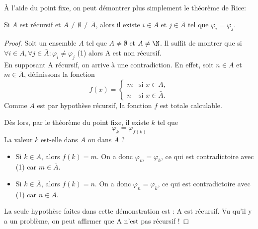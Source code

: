 \begin{myrem}
  À l'aide du point fixe, on peut démontrer plus simplement le théorème de Rice:

\begin{center}
Si $A$ est récursif et $A \neq \emptyset \neq \bar{A}$, alors il existe $i \in A$ et $j \in \bar{A}$ tel que $\varphi_i = \varphi_j$.
\end{center}

  \begin{proof}
    Soit un ensemble $A$ tel que $A \neq \emptyset$ et $A \neq \N$.  Il suffit de montrer que si
    $\forall i \in A, \forall j \in \bar{A} : \varphi_i \neq \varphi_j$  (1) alors A est non récursif. \\
    En supposant A récursif, on arrive à une contradiction.  En effet,
    soit $n \in A$ et $m \in \bar{A}$, définissons la fonction
    \[
      f(x) =
      \begin{cases}
        m & \text{si }x \in A,\\
        n & \text{si }x \in \bar{A}.
      \end{cases}
    \]
    Comme $A$ est par hypothèse récursif, la fonction $f$ est totale calculable.

    Dès lors, par le théorème du point fixe, il existe $k$ tel que
    \[ \varphi_k = \varphi_{f(k)} \]
    La valeur $k$ est-elle dans $A$ ou dans $\bar{A}$ ?
    \begin{itemize}
      \item Si $k \in A$, alors $f(k)=m$.  On a donc $\varphi_m = \varphi_k$, ce qui est contradictoire avec (1) car
       $m \in \bar{A}$.
      \item Si $k \in \bar{A}$, alors $f(k)=n$.  On a donc $\varphi_n = \varphi_k$, ce qui est contradictoire avec (1) car
        $n \in A$.
    \end{itemize}
La seule hypothèse faites dans cette démonstration est : A est récursif. Vu qu'il y a un problème, on peut affirmer que A n'est pas récursif ! 
  \end{proof}
\end{myrem}

